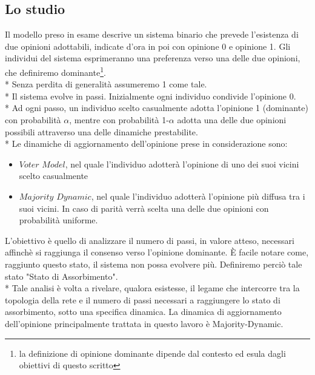 \documentclass{article}
\begin{document}
\subsection{Lo studio}
Il modello preso in esame descrive un sistema binario che prevede l'esistenza di due opinioni adottabili, indicate d'ora in poi con opinione 0 e opinione 1. Gli individui del sistema esprimeranno una preferenza verso una delle due opinioni, che definiremo  dominante\footnote{la definizione di opinione dominante dipende dal contesto ed esula dagli obiettivi di questo scritto}.\\*
Senza perdita di generalità assumeremo 1 come tale.\\*
Il sistema evolve in passi. Inizialmente ogni individuo condivide l'opinione 0.\\*
Ad ogni passo, un individuo scelto casualmente adotta l'opinione 1 (dominante) con probabilità $\alpha$, mentre con probabilità 1-$\alpha$ adotta una delle due opinioni possibili attraverso una delle dinamiche prestabilite.\\*
Le dinamiche di aggiornamento dell'opinione prese in considerazione sono:
\begin{itemize}
\item $Voter$ $Model$, nel quale l'individuo adotterà l'opinione di uno dei suoi vicini scelto casualmente
\item $Majority$ $Dynamic$, nel quale l'individuo adotterà l'opinione più diffusa tra i suoi vicini. In caso di parità verrà scelta una delle due opinioni con probabilità uniforme.
\end{itemize}
L'obiettivo è quello di analizzare il numero di passi, in valore atteso, necessari affinchè si raggiunga il consenso verso l'opinione dominante. È facile notare come, raggiunto questo stato, il sistema non possa evolvere più. Definiremo perciò tale stato "Stato di Assorbimento".\\*
Tale analisi è volta a rivelare, qualora esistesse, il legame che intercorre tra la topologia della rete e il numero di passi necessari a raggiungere lo stato di assorbimento, sotto una specifica dinamica.
La dinamica di aggiornamento dell'opinione principalmente trattata in questo lavoro è Majority-Dynamic.
\end{document}
